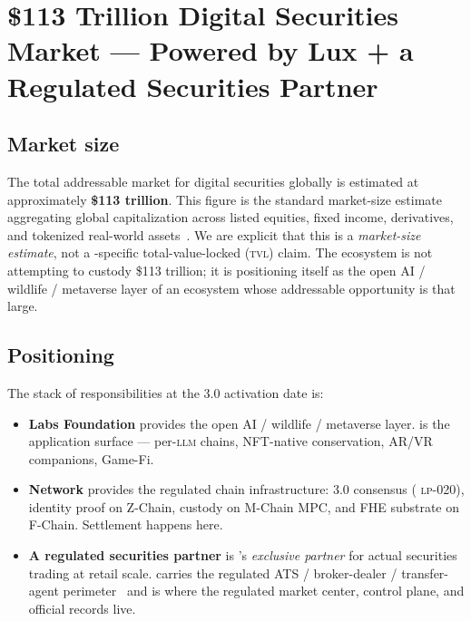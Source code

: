 \section{\$113 Trillion Digital Securities Market --- Powered by Lux + a Regulated Securities Partner}
\label{sec:securities}

\subsection{Market size}

The total addressable market for digital securities globally is
estimated at approximately \textbf{\$113 trillion}. This figure is the
standard market-size estimate aggregating global capitalization across
listed equities, fixed income, derivatives, and tokenized real-world
assets~\cite{bis-tokenization,wfe-market-cap}. We are explicit that
this is a \emph{market-size estimate}, not a \Zoo{}-specific
total-value-locked (\textsc{tvl}) claim. The \Zoo{} ecosystem is not
attempting to custody \$113 trillion; it is positioning itself as the
open AI / wildlife / metaverse layer of an ecosystem whose addressable
opportunity is that large.

\subsection{Positioning}

The stack of responsibilities at the \Quasar{} 3.0 activation date is:

\begin{itemize}[nosep,leftmargin=1.2em]
\item \textbf{\Zoo{} Labs Foundation} provides the open AI / wildlife /
  metaverse layer. \Zoo{} is the application surface --- per-\textsc{llm}
  chains, NFT-native conservation, AR/VR companions, Game-Fi.
\item \textbf{\Lux{} Network} provides the regulated chain
  infrastructure: \Quasar{} 3.0 consensus (\Lux{} \textsc{lp-020}),
  identity proof on Z-Chain, custody on M-Chain MPC, and FHE substrate
  on F-Chain. Settlement happens here.
\item \textbf{A regulated securities partner} is \Zoo{}'s
  \emph{exclusive partner} for actual securities trading at retail
  scale. \PartnerCap{} carries the regulated ATS / broker-dealer /
  transfer-agent perimeter~\cite{liquidity-perimeter} and is where the
  regulated market center, control plane, and official records live.
\end{itemize}

